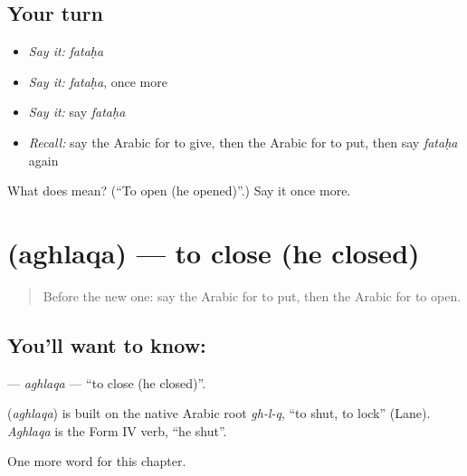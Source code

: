 \subsection*{Your turn}
\begin{itemize}
\raggedright
  \item \emph{Say it:} \emph{fataḥa}
  \item \emph{Say it:} \emph{fataḥa}, once more
  \item \emph{Say it:} say \emph{fataḥa}
  \item \emph{Recall:} say the Arabic for to give, then the Arabic for to put, then say \emph{fataḥa} again
\end{itemize}

\begin{tcolorbox}[breakable,colback=teal!4,colframe=teal!35!black,title={Before you move on}]
What does  mean? (\textquotedblleft{}To open (he opened)\textquotedblright{}.) Say it once more.
\end{tcolorbox}
\section[\texorpdfstring{\ar{أغلق} (aghlaqa)}{أغلق (aghlaqa)}]{ (aghlaqa) — to close (he closed)}

\label{lesson:AR-C59-aghlaqa}



\begin{quote}
Before the new one: say the Arabic for to put, then the Arabic for to open.
\end{quote}

\subsection*{You'll want to know: }
\textbf{} — \emph{aghlaqa} — \textquotedblleft{}to close (he closed)\textquotedblright{}.

\begin{cousinweb}
\textbf{} (\emph{aghlaqa}) is built on the native Arabic root \emph{gh-l-q}, \textquotedblleft{}to shut, to lock\textquotedblright{} (Lane). \emph{Aghlaqa} is the Form IV verb, \textquotedblleft{}he shut\textquotedblright{}.
\end{cousinweb}

\begin{grammarlens}[title={What you've built}]
One more word for this chapter.
\end{grammarlens}

